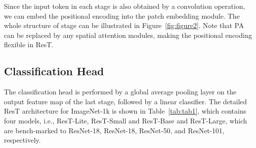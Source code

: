 \documentclass{article}
\begin{document}
Since the input token in each stage is also obtained by a convolution operation, we can embed the positional encoding into the patch embedding module. The whole structure of stage  can be illustrated in Figure~\ref{fig:figure2}. Note that PA can be replaced by any spatial attention modules, making the positional encoding flexible in ResT.


\subsection{Classification Head}
The classification head is performed by a global average pooling layer on the output feature map of the last stage, followed by a linear classifier. The detailed ResT architecture for ImageNet-1k is shown in Table~\ref{tab:tab1}, which contains four models, i.e., ResT-Lite, ResT-Small and ResT-Base and ResT-Large, which are bench-marked to ResNet-18, ResNet-18, ResNet-50, and ResNet-101, respectively. 
\end{document}
